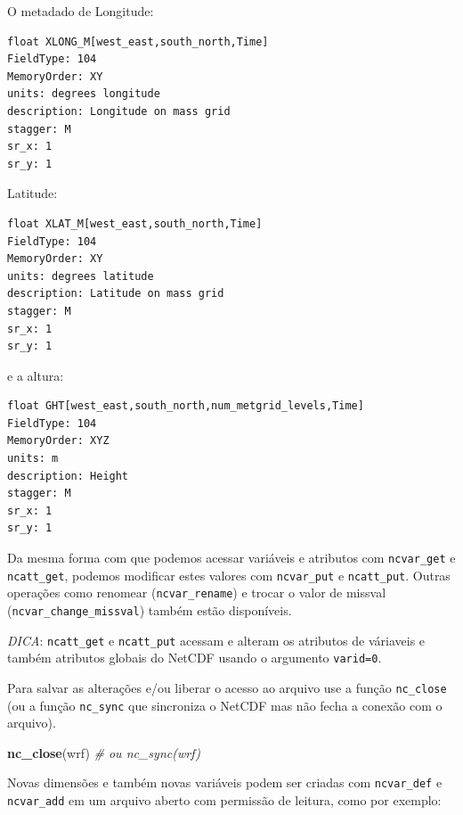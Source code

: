 \documentclass[]{book}
\newenvironment{Shaded}{\begin{snugshade}}{\end{snugshade}}
\newcommand{\KeywordTok}[1]{\textcolor[rgb]{0.13,0.29,0.53}{\textbf{#1}}}
\newcommand{\CommentTok}[1]{\textcolor[rgb]{0.56,0.35,0.01}{\textit{#1}}}
\newcommand{\NormalTok}[1]{#1}
\begin{document}
O metadado de Longitude:

\begin{verbatim}
float XLONG_M[west_east,south_north,Time]   
FieldType: 104
MemoryOrder: XY 
units: degrees longitude
description: Longitude on mass grid
stagger: M
sr_x: 1
sr_y: 1
\end{verbatim}

Latitude:

\begin{verbatim}
float XLAT_M[west_east,south_north,Time]   
FieldType: 104
MemoryOrder: XY 
units: degrees latitude
description: Latitude on mass grid
stagger: M
sr_x: 1
sr_y: 1
\end{verbatim}

e a altura:

\begin{verbatim}
float GHT[west_east,south_north,num_metgrid_levels,Time]   
FieldType: 104
MemoryOrder: XYZ
units: m
description: Height
stagger: M
sr_x: 1
sr_y: 1
\end{verbatim}

Da mesma forma com que podemos acessar variáveis e atributos com
\texttt{ncvar\_get} e \texttt{ncatt\_get}, podemos modificar estes
valores com \texttt{ncvar\_put} e \texttt{ncatt\_put}. Outras operações
como renomear (\texttt{ncvar\_rename}) e trocar o valor de missval
(\texttt{ncvar\_change\_missval}) também estão disponíveis.

\emph{DICA}: \texttt{ncatt\_get} e \texttt{ncatt\_put} acessam e alteram
os atributos de váriaveis e também atributos globais do NetCDF usando o
argumento \texttt{varid=0}.

Para salvar as alterações e/ou liberar o acesso ao arquivo use a função
\texttt{nc\_close} (ou a função \texttt{nc\_sync} que sincroniza o
NetCDF mas não fecha a conexão com o arquivo).

\begin{Shaded}
\begin{Highlighting}[]
\KeywordTok{nc_close}\NormalTok{(wrf) }\CommentTok{# ou nc_sync(wrf)}
\end{Highlighting}
\end{Shaded}

Novas dimensões e também novas variáveis podem ser criadas com
\texttt{ncvar\_def} e \texttt{ncvar\_add} em um arquivo aberto com
permissão de leitura, como por exemplo:
\end{document}
